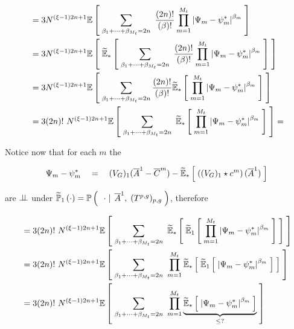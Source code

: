 	\begin{align*}
		&= 3 N^{(\xi -1) 2 n + 1}
		\mathbb{E} \left[ \; 
			\sum_{\beta_1 + \cdots + \beta_{M_t} =2n} \
			\frac{(2n)!}{(\beta)!}
			\prod_{m=1}^{M_t}
			\left| 
				\Psi_m - \psi_m^\ast
			 \right|^{\beta_m}
		 \; \right]
		\\
		& = 3 N^{(\xi -1) 2 n + 1}
		\mathbb{E} \left[ \; 
			\widetilde{\mathbb{E}}_{\ast} \left[ \; 
				\sum_{\beta_1 + \cdots + \beta_{M_t} =2n} \
				\frac{(2n)!}{(\beta)!}
				\prod_{m=1}^{M_t}
				\left| 
					\Psi_m - \psi_m^\ast
				 \right|^{\beta_m}
			 \; \right]
		 \; \right]
		\\
		& = 3 N^{(\xi -1) 2 n + 1}
		\mathbb{E} \left[ \; 
			\sum_{\beta_1 + \cdots + \beta_{M_t} =2n}
			\frac{(2n)!}{(\beta)!}
			\widetilde{\mathbb{E}}_{\ast} \left[ \; 
				\prod_{m=1}^{M_t}
				\left| 
					\Psi_m - \psi_m^\ast
				 \right|^{\beta_m}
		 \; \right] \; \right]
		\\
		& = 
		3(2n)!\
		N^{(\xi -1) 2 n + 1}
		\mathbb{E} \left[ \; 
			\sum_{\beta_1 + \cdots + \beta_{M_t} =2n}\
			\widetilde{\mathbb{E}}_{\ast} \left[ \; 
				\prod_{m=1}^{M_t}
				\left| 
					\Psi_m - \psi_m^\ast
				 \right|^{\beta_m}
		 \; \right] \; \right]
		=
	\end{align*}
	
	Notice now that for each $m$ the \rv
	
	\begin{equation}
		\Psi_m - \psi_m^\ast 
		\quad
		= 
		\quad
		(V_{G})_1(\overline{A}^1 - \overline{C}^m)
		- \widetilde{\mathbb{E}}_{\ast} \left[ \;  \left( (V_{G})_1 \star c^m \right) (\overline{A}^1) \; \right]
	\end{equation}
	
	are $\perp \!\!\! \perp$ under $\widetilde{\mathbb{P}}_{1} \left( \cdot\right) = \mathbb{P} \left( \; \left. \; \cdot \; \right| \; \overline{A}^1,\;(T^{p,g})_{p,g}  \; \right)$, therefore
	
	\begin{equation}\label{proof-of-LLN1:calculations-before-claim}
		\begin{aligned}
			&=
			3(2n)!\
			N^{(\xi -1) 2 n + 1}
			\mathbb{E} \left[ \; 
				\sum_{\beta_1 + \cdots + \beta_{M_t} =2n} \
				\widetilde{\mathbb{E}}_{\ast} \left[ \; 
					\widetilde{\mathbb{E}}_{1} \left[ \; 
						\prod_{m=1}^{M_t}
						\left| 
							\Psi_m - \psi_m^\ast
						 \right|^{\beta_m}
			 \; \right] \; \right]  \; \right]
			\\
			&=
			3(2n)!\
			N^{(\xi -1) 2 n + 1}
			\mathbb{E} \left[ \; 
				\sum_{\beta_1 + \cdots + \beta_{M_t} =2n}\
				\prod_{m=1}^{M_t}
				\widetilde{\mathbb{E}}_{\ast} \left[ \; 
					\widetilde{\mathbb{E}}_{1} \left[ \; 
						\left| 
							\Psi_m - \psi_m^\ast
						 \right|^{\beta_m}
					 \; \right]
				 \; \right]
			 \; \right]
			\\
			& =
			3(2n)!\
			N^{(\xi -1) 2 n + 1}
			\mathbb{E} \left[ \; 
				\sum_{\beta_1 + \cdots + \beta_{M_t} =2n}\
				\prod_{m=1}^{M_t}
				\underbrace{
					\widetilde{\mathbb{E}}_{\ast} \left[ \; 
						\left| 
							\Psi_m - \psi_m^\ast
						 \right|^{\beta_m}
					 \; \right]
				}_{\leq ?}
			 \; \right]
			\\
		\end{aligned}
	\end{equation}
	

